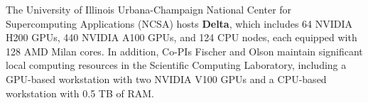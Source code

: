 
The University of Illinois Urbana-Champaign National Center
for Supercomputing Applications (NCSA) hosts {\bf Delta},
which includes 64 NVIDIA H200 GPUs, 440 NVIDIA A100 GPUs,
and 124 CPU nodes, each equipped with 128 AMD Milan cores.
In addition, Co-PIs Fischer and Olson maintain significant local
computing resources in the Scientific Computing Laboratory,
including a GPU-based workstation with two NVIDIA V100 GPUs
and a CPU-based workstation with 0.5 TB of RAM.

